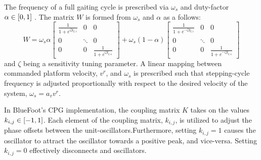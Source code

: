 			The frequency of a full gaiting cycle is prescribed via $\omega_{s}$ and duty-factor $\alpha \in \left[0,1\right]$ \cite{Matos2010}. The matrix $W$ is formed from  $\omega_{s}$ and $\alpha$ as a follows:
				\newcommand{\Wel}[1]{\frac{1}{1+e^{#1}}}
				\begin{equation}
						W = 
						\omega_{s}\alpha 
						\left[	
							\begin{array}{ccc}
								\Wel{\zeta y_{2,1}} 		& 0 			& 0  \\
								0 							& \ddots 		& 0  \\
								0							& 0		 		& \Wel{\zeta y_{2,4}}
							\end{array}
						\right] + 
						\omega_{s}(1-\alpha) 
						\left[	
							\begin{array}{cccc}
								\Wel{-\zeta y_{2,1}} 		& 0 			& 0  \\
								0 							& \ddots 		& 0  \\
								0							& 0		 		& \Wel{-\zeta y_{2,4}}
							\end{array}
						\right]
					\label{eq::cpg_W_matrix_def}
				\end{equation}
			and $\zeta$ being a sensitivity tuning parameter. A linear mapping between commanded platform velocity, $v^{r}$, and $\omega_{s}$ is prescribed such that stepping-cycle frequency is adjusted proportionally with respect to the desired velocity of the system, \IE $\omega_{s} = a_{v}v^{r}$.

			In BlueFoot's CPG implementation, the coupling matrix $K$ takes on the values $k_{i,j} \in \left[-1,1\right]$. Each element of the coupling matrix, $k_{i,j}$, is utilized to adjust the phase offsets between the unit-oscillators.Furthermore, setting $k_{i,j}=1$ causes the \Jth oscillator to attract the \Ith oscillator  towards a  positive peak, and vice-versa. Setting $k_{i,j}=0$ effectively disconnects \Ith and \Jth oscillators. 

